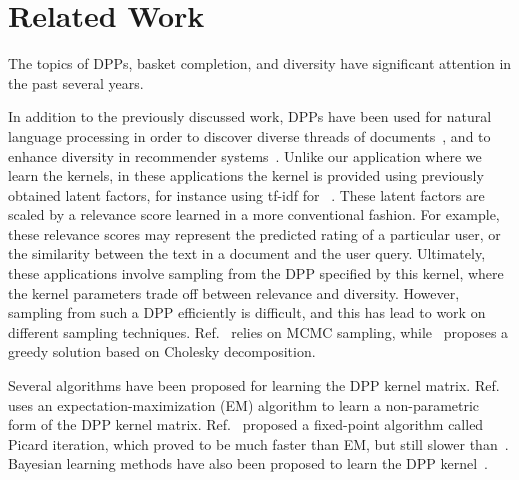 
\section{Related Work}
The topics of DPPs, basket completion, and diversity have significant attention
in the past several years.

In addition to the previously discussed work, DPPs have been used for natural
language processing in order to discover diverse threads of
documents~\cite{Gillenwater:2012:DDS:2390948.2391026}, and to enhance diversity
in recommender
systems~\cite{Foulds2013DiversePW,DBLP:journals/corr/abs-1709-05135}. Unlike our
application where we learn the kernels, in these applications the kernel is
provided using previously obtained latent factors, for instance using tf-idf for
~\cite{Gillenwater:2012:DDS:2390948.2391026}. These latent factors are scaled by
a relevance score learned in a more conventional fashion. For example, these
relevance scores may represent the predicted rating of a particular user, or the
similarity between the text in a document and the user query. Ultimately, these
applications involve sampling from the DPP specified by this kernel, where the
kernel parameters trade off between relevance and diversity. However, sampling
from such a DPP efficiently is difficult, and this has lead to work on different
sampling techniques.  Ref.~\cite{DBLP:journals/corr/HanKPS17,NIPS2014_5564,DBLP:conf/icml/GautierBV17}
relies on MCMC sampling, while~\cite{DBLP:journals/corr/abs-1709-05135}
proposes a greedy solution based on Cholesky decomposition. 

Several algorithms have been proposed for learning the DPP kernel matrix.
Ref.~\cite{NIPS2014_5564} uses an expectation-maximization (EM) algorithm to
learn a non-parametric form of the DPP kernel matrix.
Ref.~\cite{DBLP:journals/corr/MarietS15} proposed a fixed-point algorithm called
Picard iteration, which proved to be much faster than EM, but still slower
than~\cite{DBLP:conf/aaai/GartrellPK17}. Bayesian learning methods have also
been proposed to learn the DPP
kernel~\cite{DBLP:conf/recsys/GartrellPK16,DBLP:conf/icml/AffandiFAT14}.

